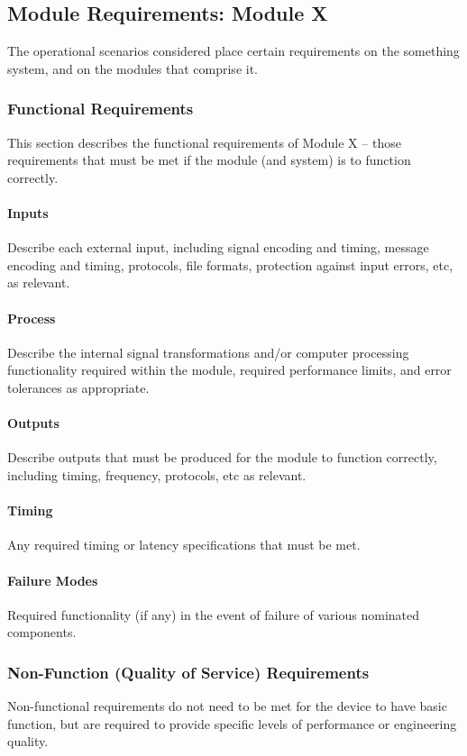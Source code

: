 \documentclass[MTRX3700report.tex]{subfiles}
\begin{document}
\subsection{Module Requirements: Module X}
The operational scenarios considered place certain requirements on the something system, and on the modules that comprise it.
\subsubsection{Functional Requirements}
This section describes the functional requirements of Module X – those requirements that must be met if the module (and system) is to function correctly.  

\paragraph{Inputs}
Describe each external input, including signal encoding and timing, message encoding and timing, protocols, file formats, protection against input errors, etc, as relevant.
\paragraph{Process}
Describe the internal signal transformations and/or computer processing functionality required within the module, required performance limits, and error tolerances as appropriate.
\paragraph{Outputs}
Describe outputs that must be produced for the module to function correctly, including timing, frequency, protocols, etc as relevant.
\paragraph{Timing}
Any required timing or latency specifications that must be met.
\paragraph{Failure Modes}
Required functionality (if any) in the event of failure of various nominated components.

\subsubsection{Non-Function (Quality of Service) Requirements}
Non-functional requirements do not need to be met for the device to have basic function, but are required to provide specific levels of performance or engineering quality.
\end{document}
